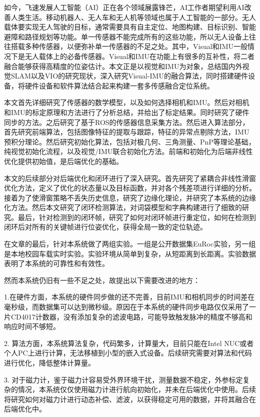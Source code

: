 

\begin{conclusion}
如今，飞速发展人工智能（AI）正在各个领域展露锋芒，AI工作者期望利用AI改善人类生活。移动机器人、无人车和无人机等领域也属于人工智能的一部分。无人载体要实现无人驾驶的目标，通常需要具有自主定位、地图构建、目标识别、智能避障和路径规划等功能。单一传感器不能完成所有的这些功能，所以无人设备上往往搭载多种传感器，以便弥补单一传感器的不足之处。其中，Visual和IMU一般情况下是无人载体上的必备传感器。Visual和IMU在功能上有很多的互补性，将二者融合能够获得高精度的位姿估计。本文正是以视觉和IMU为对象，总结国内外视觉SLAM以及VIO的研究现状，深入研究Visual-IMU的融合算法，同时搭建硬件设备，将硬件设备和软件算法结合起来构建一套多传感融合定位系统。

本文首先详细研究了传感器的数学模型，以及如何选择相机和IMU。然后对相机和IMU的标定原理和方法进行了分析总结，并给出了标定结果。同时研究了硬件同步的方法。之后研究了基于ROS的传感器信息采集方法。然后进入算法部分，首先研究前端算法，包括图像特征的提取与跟踪，特征的异常点剔除方法，IMU预积分理论。然后研究初始化算法，包括对极几何、三角测量、PnP等理论基础，纯视觉初始化流程，以及视觉/IMU联合初始化方法。前端和初始化为后端非线性优化提供初始值，是后端优化的基础。

本文的后续部分对后端优化和闭环进行了深入研究。首先研究了紧耦合非线性滑窗优化方法，定义了优化的状态量以及目标函数，并对各个残差项进行详细的分析。接着为了使滑窗策略不丢失历史信息，研究了边缘化理论，并研究了本系统的边缘化方法。然后本文研究了闭环检测算法，对词袋模型和字典构建进行了细致的研究。最后，针对检测到的闭环帧，研究了如何对闭环帧进行重定位，如何在检测到闭环后对所有的关键帧进行位姿优化，获得全局一致的定位轨迹。

在文章的最后，针对本系统做了两组实验。一组是公开数据集EuRoc实验，另一组是本地校园车载实时实验。实验环境从简单到复杂，从短距离到长距离。实验数据表明了本系统的可靠性和有效性。

然而本系统仍旧有一些不足之处，故提出以下需要改进的地方：

1.在硬件方面，本系统的硬件同步做的还不完善，目前IMU和相机同步的时间差在毫秒级，而数据集可以达到微秒级。原因在于本系统的硬件同步电路仅仅采用了一片CD4017计数器，没有添加复杂的滤波电路，可能导致触发脉冲的精度不够高和响应时间不够短。

2. 算法方面，本系统算法复杂，代码繁多，计算量大，目前只能在Intel NUC或者个人PC上进行计算，无法移植到小型的嵌入式设备。后续研究需要对算法和代码进行优化，降低整体计算量。

3. 对于磁力计，鉴于磁力计容易受外界环境干扰，测量数据不稳定，外参标定复杂的情况，本系统仅仅使用磁力计进行航向初始化，并未在后端优化中使用。后续将研究如何对磁力计进行动态补偿、滤波，以获得稳定可用的数据，并将其融合在后端优化中。
\end{conclusion}